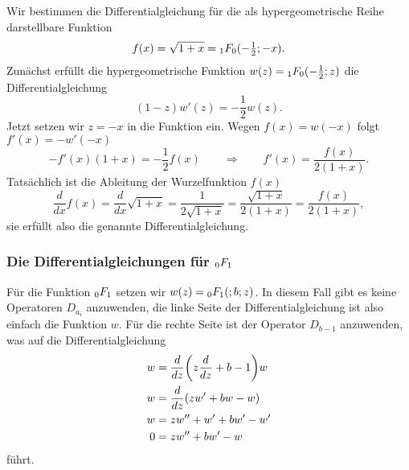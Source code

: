 \begin{beispiel}
Wir bestimmen die Differentialgleichung für die als hypergeometrische
Reihe darstellbare Funktion
\[
f(x)
=
\sqrt{1+x} = \mathstrut_1F_0(-{\textstyle\frac12};-x).
\]
Zunächst erfüllt die hypergeometrische Funktion
$w(z)=\mathstrut_1F_0(-\frac12;z)$ die Differentialgleichung
\[
(1-z)w'(z) = -\frac12 w(z).
\]
Jetzt setzen wir $z=-x$ in die Funktion ein.
Wegen $f(x)=w(-x)$ folgt $f'(x)=-w'(-x)$
\[
-f'(x)(1+x) = -\frac12 f(x)
\qquad\Rightarrow\qquad
f'(x) = \frac{f(x)}{2(1+x)}.
\]
Tatsächlich ist die Ableitung der Wurzelfunktion $f(x)$
\[
\frac{d}{dx}f(x)
=
\frac{d}{dx}\sqrt{1+x}
=
\frac{1}{2\sqrt{1+x}}
=
\frac{\sqrt{1+x}}{2(1+x)}
=
\frac{f(x)}{2(1+x)},
\]
sie erfüllt also die genannte Differentialgleichung.
\end{beispiel}

%
%
\subsubsection{Die Differentialgleichungen für $\mathstrut_0F_1$}
Für die Funktion $\mathstrut_0F_1$ setzen wir
$w(z)=\mathstrut_0F_1(;b;z)$.
In diesem Fall gibt es keine Operatoren $D_{a_i}$ anzuwenden, die
linke Seite der Differentialgleichung ist also einfach die Funktion $w$.
Für die rechte Seite ist der Operator $D_{b-1}$ anzuwenden, was auf
die Differentialgleichung
\begin{align}
w
&=
\frac{d}{dz}
\biggl(z\frac{d}{dz}+b -1\biggr)w
\notag
\\
w
&=
\frac{d}{dz}(zw'+b w - w)
\notag
\\
w
&=
zw''+w'+b w' -w'
\notag
\\
0
&=
zw''+b w' - w
\label{buch:differentialgleichungen:0f1:dgl}
\end{align}
führt.


